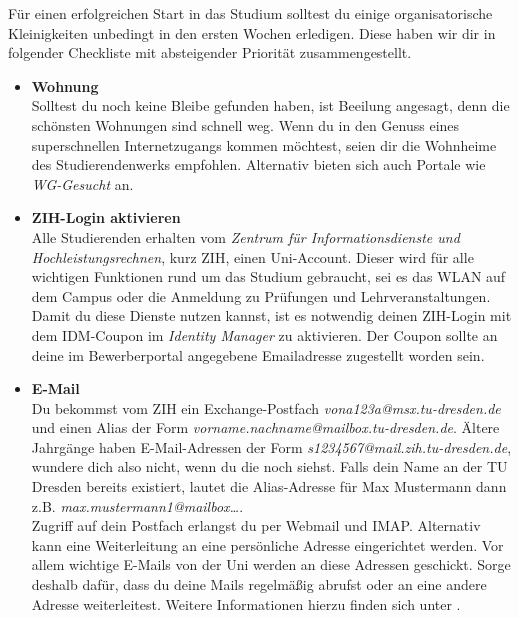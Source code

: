 \newcommand{\checkbox}[1]{\item[$\square$]\textbf{#1}\\}


Für einen erfolgreichen Start in das Studium solltest du einige organisatorische
Kleinigkeiten unbedingt in den ersten Wochen erledigen. Diese haben wir dir in
folgender Checkliste mit absteigender Priorität zusammengestellt.

\begin{itemize}[leftmargin=*]

\checkbox{Wohnung}
Solltest du noch keine Bleibe gefunden haben, ist Beeilung angesagt, denn die
schönsten Wohnungen sind schnell weg. Wenn du in den Genuss eines
superschnellen Internetzugangs kommen möchtest, seien dir die Wohnheime
 des
Studierendenwerks empfohlen. Alternativ bieten sich auch Portale wie
\textit{WG-Gesucht}  an.

\checkbox{ZIH-Login aktivieren}
Alle Studierenden erhalten vom \textit{Zentrum für Informationsdienste und
Hochleistungsrechnen}, kurz ZIH, einen Uni-Account. Dieser wird für alle
wichtigen Funktionen rund um das Studium gebraucht, sei es das WLAN auf dem
Campus oder die Anmeldung zu Prüfungen und Lehrveranstaltungen. \\
Damit du diese Dienste nutzen kannst, ist es notwendig deinen ZIH-Login mit dem
IDM-Coupon im \textit{Identity Manager} 
zu aktivieren. Der Coupon sollte an deine im Bewerberportal angegebene
Emailadresse zugestellt worden sein.

\checkbox{E-Mail}
Du bekommst vom ZIH ein Exchange-Postfach \textit{vona123a@msx.tu-dresden.de}
und einen Alias der Form \textit{vorname.nachname@mailbox.tu-dresden.de}.
Ältere Jahrgänge haben E-Mail-Adressen der Form
\textit{s1234567\allowbreak{}@mail.zih.tu-dresden.de}, wundere dich also nicht,
wenn du die noch siehst. Falls dein Name an der TU Dresden bereits existiert,
lautet die Alias-Adresse für Max Mustermann dann z.B.
\textit{max.mustermann1@mailbox…}. \\
Zugriff auf dein Postfach erlangst du per Webmail und IMAP\@. Alternativ kann eine
Weiterleitung an eine persönliche Adresse eingerichtet werden. Vor allem
wichtige E-Mails von der Uni werden an diese Adressen geschickt. Sorge deshalb
dafür, dass du deine Mails regelmäßig abrufst oder an eine andere Adresse
weiterleitest. Weitere Informationen hierzu finden sich unter
.


\end{itemize}
